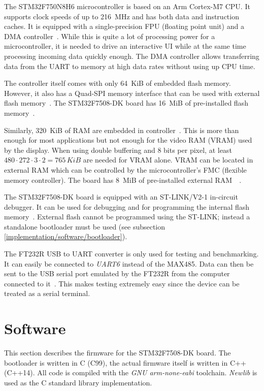 The STM32F750N8H6 microcontroller is based on an Arm Cortex-M7 CPU. It supports clock speeds of up to
\SI{216}{\mega\hertz} and has both data and instruction caches. It is equipped with a single-precision
FPU (floating point unit) and a DMA controller~\cite{mcu-datasheet}. While this is quite a lot of
processing power for a microcontroller, it is needed to drive an interactive UI while at the same time
processing incoming data quickly enough. The DMA controller allows transferring data from the UART to
memory at high data rates without using up CPU time.

The controller itself comes with only \SI{64}{KiB} of embedded flash memory. However, it also has a
Quad-SPI memory interface that can be used with external flash memory~\cite{mcu-datasheet}. The
STM32F7508-DK board has \SI{16}{MiB} of pre-installed flash memory~\cite{board-user-manual}.

Similarly, \SI{320}{KiB} of RAM are embedded in controller~\cite{mcu-datasheet}. This is more than
enough for most applications but not enough for the video RAM (VRAM) used by the display. When using
double buffering and 8 bits per pixel, at least $480 \cdot 272 \cdot 3 \cdot 2 = 765\,\si{KiB}$ are
needed for VRAM alone. VRAM can be located in external RAM which can be controlled by the microcontroller's
FMC (flexible memory controller). The board has \SI{8}{MiB} of pre-installed external RAM~\
\cite{mcu-datasheet}\cite{board-user-manual}.

The STM32F7508-DK board is equipped with an ST-LINK/V2-1 in-circuit debugger. It can be used for
debugging and for programming the internal flash memory~\cite{board-user-manual}. External flash
cannot be programmed using the ST-LINK; instead a standalone bootloader must be used (see subsection
\ref{implementation/software/bootloader}).

The FT232R USB to UART converter is only used for testing and benchmarking. It can easily be connected
to \textit{UART6} instead of the MAX485. Data can then be sent to the USB serial port emulated by
the FT232R from the computer connected to it~\cite{ftdi-232r-datasheet}. This makes testing extremely
easy since the device can be treated as a serial terminal.

\section{Software}
\label{implementation/software}

This section describes the firmware for the STM32F7508-DK board. The bootloader is written in C
(C99), the actual firmware itself is written in C++ (C++14). All code is compiled with the
\textit{GNU arm-none-eabi} toolchain. \textit{Newlib} is used as the C standard library implementation.

